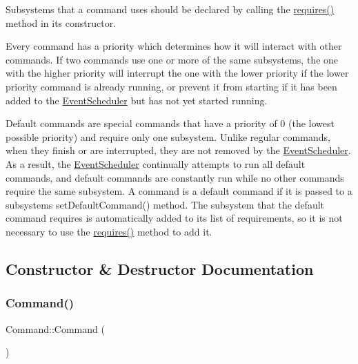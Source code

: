 Subsystems that a command uses should be declared by calling the \mbox{\hyperlink{classlib_iterative_robot_1_1_command_ad7b7f328974f5f17a2a4b1593b6c9eb5}{requires()}} method in its constructor.

Every command has a priority which determines how it will interact with other commands. If two commands use one or more of the same subsystems, the one with the higher priority will interrupt the one with the lower priority if the lower priority command is already running, or prevent it from starting if it has been added to the \mbox{\hyperlink{classlib_iterative_robot_1_1_event_scheduler}{Event\+Scheduler}} but has not yet started running.

Default commands are special commands that have a priority of 0 (the lowest possible priority) and require only one subsystem. Unlike regular commands, when they finish or are interrupted, they are not removed by the \mbox{\hyperlink{classlib_iterative_robot_1_1_event_scheduler}{Event\+Scheduler}}. As a result, the \mbox{\hyperlink{classlib_iterative_robot_1_1_event_scheduler}{Event\+Scheduler}} continually attempts to run all default commands, and default commands are constantly run while no other commands require the same subsystem. A command is a default command if it is passed to a subsystem\textquotesingle{}s set\+Default\+Command() method. The subsystem that the default command requires is automatically added to its list of requirements, so it is not necessary to use the \mbox{\hyperlink{classlib_iterative_robot_1_1_command_ad7b7f328974f5f17a2a4b1593b6c9eb5}{requires()}} method to add it. 

\subsection{Constructor \& Destructor Documentation}
\mbox{\label{classlib_iterative_robot_1_1_command_a18df2d81039392daeb0b78c346a70537}} 
\subsubsection{\texorpdfstring{Command()}{Command()}}
{\footnotesize\ttfamily Command\+::\+Command (\begin{DoxyParamCaption}{ }\end{DoxyParamCaption})}



